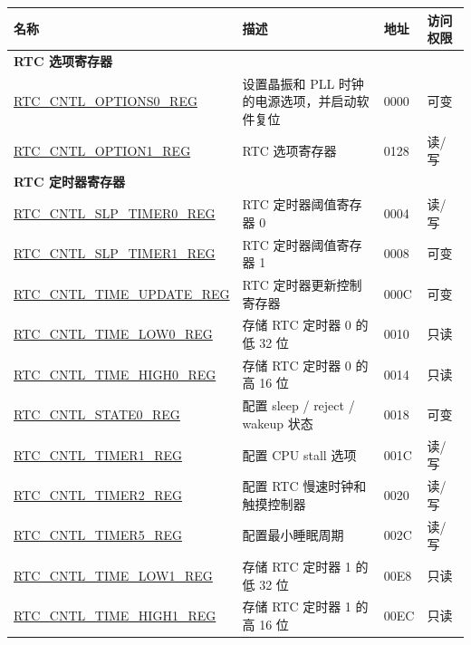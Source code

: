\begin{longtable}{ | p{6.5cm} | p{6.8cm} | p{1.3cm} | p{1cm} | }
\hline\rowcolor{lightgray}
名称& 描述 & 地址 & 访问权限 \\ \hline
\endhead
\multicolumn{4}{|l|}{\textbf{RTC 选项寄存器}} \\ \hline
\hyperref[regdesc:RTCCNTLOPTIONS0REG]{RTC\_CNTL\_OPTIONS0\_REG} & 设置晶振和 PLL 时钟的电源选项，并启动软件复位  & \hexprefix{}0000 & 可变 \\ \hline
\hyperref[regdesc:RTCCNTLOPTION1REG]{RTC\_CNTL\_OPTION1\_REG} & RTC 选项寄存器 & \hexprefix{}0128 & 读/写 \\ \hline
\multicolumn{4}{|l|}{\textbf{RTC 定时器寄存器}} \\ \hline
\hyperref[regdesc:RTCCNTLSLPTIMER0REG]{RTC\_CNTL\_SLP\_TIMER0\_REG} & RTC 定时器阈值寄存器 0 & \hexprefix{}0004 & 读/写 \\ \hline
\hyperref[regdesc:RTCCNTLSLPTIMER1REG]{RTC\_CNTL\_SLP\_TIMER1\_REG} & RTC 定时器阈值寄存器 1 & \hexprefix{}0008 & 可变 \\ \hline
\hyperref[regdesc:RTCCNTLTIMEUPDATEREG]{RTC\_CNTL\_TIME\_UPDATE\_REG} & RTC 定时器更新控制寄存器 & \hexprefix{}000C & 可变 \\ \hline
\hyperref[regdesc:RTCCNTLTIMELOW0REG]{RTC\_CNTL\_TIME\_LOW0\_REG} & 存储 RTC 定时器 0 的低 32 位  & \hexprefix{}0010 & 只读 \\ \hline
\hyperref[regdesc:RTCCNTLTIMEHIGH0REG]{RTC\_CNTL\_TIME\_HIGH0\_REG} & 存储 RTC 定时器 0 的高 16 位 & \hexprefix{}0014 & 只读 \\ \hline
\hyperref[regdesc:RTCCNTLSTATE0REG]{RTC\_CNTL\_STATE0\_REG} & 配置 sleep / reject / wakeup 状态 & \hexprefix{}0018 & 可变 \\ \hline
\hyperref[regdesc:RTCCNTLTIMER1REG]{RTC\_CNTL\_TIMER1\_REG} & 配置 CPU stall 选项 & \hexprefix{}001C & 读/写 \\ \hline
\hyperref[regdesc:RTCCNTLTIMER2REG]{RTC\_CNTL\_TIMER2\_REG} & 配置 RTC 慢速时钟和触摸控制器 & \hexprefix{}0020 & 读/写 \\ \hline
\hyperref[regdesc:RTCCNTLTIMER5REG]{RTC\_CNTL\_TIMER5\_REG} & 配置最小睡眠周期 & \hexprefix{}002C & 读/写 \\ \hline
\hyperref[regdesc:RTCCNTLTIMELOW1REG]{RTC\_CNTL\_TIME\_LOW1\_REG} & 存储 RTC 定时器 1 的低 32 位 & \hexprefix{}00E8 & 只读 \\ \hline
\hyperref[regdesc:RTCCNTLTIMEHIGH1REG]{RTC\_CNTL\_TIME\_HIGH1\_REG} & 存储 RTC 定时器 1 的高 16 位 & \hexprefix{}00EC & 只读 \\ \hline

\end{longtable}
